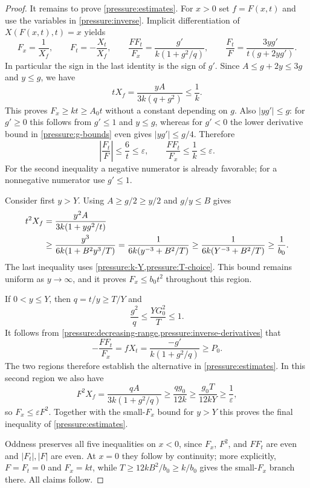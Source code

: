 \documentclass[11pt]{article}
\numberwithin{equation}{section}
\theoremstyle{definition}
\theoremstyle{remark}
\begin{document}
\begin{proof}
It remains to prove \cref{pressure:estimates}.  For $x>0$ set
$f=F(x,t)$ and use the variables in \cref{pressure:inverse}.  Implicit
differentiation of $X(F(x,t),t)=x$ yields
\begin{equation}\label{pressure:signed-identities}
 F_x=\frac1{X_f},\qquad F_t=-\frac{X_t}{X_f},\qquad
 \frac{FF_t}{F_x}=\frac{g'}{k(1+g^2/q)},\qquad
 \frac{F_t}{F}=\frac{3yg'}{t(g+2yg')}.
\end{equation}
In particular the sign in the last identity is the sign of $g'$.
Since $A\le g+2y\le3g$ and $y\le g$, we have
\begin{equation}\label{pressure:lower-slope}
 tX_f=\frac{yA}{3k(q+g^2)}\le\frac1k.
\end{equation}
This proves $F_x\ge kt\ge A_0t$ without a constant depending on $g$.
Also $|yg'|\le g$: for $g'\ge0$ this follows from $g'\le1$ and
$y\le g$, whereas for $g'<0$ the lower derivative bound in
\cref{pressure:g-bounds} even gives $|yg'|\le g/4$.  Therefore
\[
 \left|\frac{F_t}{F}\right|\le\frac6t\le\varepsilon,
 \qquad
 \frac{FF_t}{F_x}\le\frac1k\le\varepsilon.
\]
For the second inequality a negative numerator is already favorable;
for a nonnegative numerator use $g'\le1$.

Consider first $y>Y$.  Using $A\ge g/2\ge y/2$ and $g/y\le B$ gives
\begin{align}
 t^2X_f
 &=\frac{y^2A}{3k(1+yg^2/t)}\notag\\
 &\ge\frac{y^3}{6k(1+B^2y^3/T)}
  =\frac1{6k(y^{-3}+B^2/T)}
  \ge\frac1{6k(Y^{-3}+B^2/T)}
  \ge\frac1{b_0}.
 \label{pressure:large-y}
\end{align}
The last inequality uses \cref{pressure:k-Y,pressure:T-choice}.
This bound remains uniform as $y\to\infty$, and it proves
$F_x\le b_0t^2$ throughout this region.

If $0<y\le Y$, then $q=t/y\ge T/Y$ and
\[
 \frac{g^2}{q}\le\frac{YG_0^2}{T}\le1.
\]
It follows from \cref{pressure:decreasing-range,pressure:inverse-derivatives}
that
\begin{equation}\label{pressure:favorable-branch}
 -\frac{FF_t}{F_x}=fX_t
   =\frac{-g'}{k(1+g^2/q)}\ge P_0.
\end{equation}
The two regions therefore establish the alternative in
\cref{pressure:estimates}.  In this second region we also have
\begin{equation}\label{pressure:quadratic-upper}
 F^2X_f=\frac{qA}{3k(1+g^2/q)}
   \ge\frac{qg_0}{12k}
   \ge\frac{g_0T}{12kY}\ge\frac1\varepsilon,
\end{equation}
so $F_x\le\varepsilon F^2$.  Together with the small-$F_x$ bound for $y>Y$
this proves the final inequality of \cref{pressure:estimates}.

Oddness preserves all five inequalities on $x<0$, since $F_x$, $F^2$,
and $FF_t$ are even and $|F_t|,|F|$ are even.  At $x=0$ they follow
by continuity; more explicitly, $F=F_t=0$ and $F_x=kt$, while
$T\ge12kB^2/b_0\ge k/b_0$ gives the small-$F_x$ branch there.
All claims follow.
\end{proof}
\end{document}
